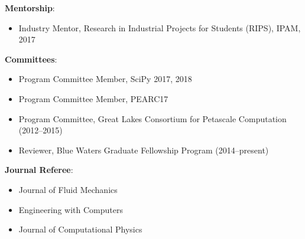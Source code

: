 
\textbf{Mentorship}:
\begin{itemize}
\itemsep 0pt
 \item Industry Mentor, Research in Industrial Projects for Students
       (RIPS), IPAM, 2017
\end{itemize}

\blankline


\textbf{Committees}:
\begin{itemize}
\itemsep 0pt
 \item Program Committee Member, SciPy 2017, 2018
 \item Program Committee Member, PEARC17
 \item Program Committee, Great Lakes Consortium for Petascale Computation (2012--2015)
 \item Reviewer, Blue Waters Graduate Fellowship Program (2014--present)
\end{itemize}

\blankline

\textbf{Journal Referee}:
\begin{itemize}
\itemsep 0pt
 \item Journal of Fluid Mechanics
 \item Engineering with Computers
 \item Journal of Computational Physics
\end{itemize}
